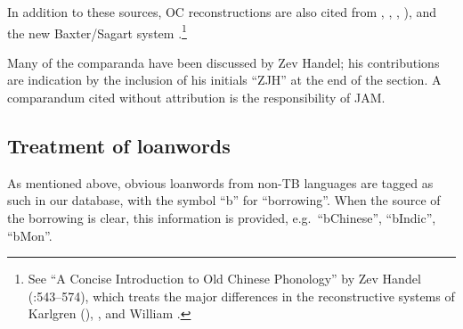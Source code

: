 In addition to these sources, OC reconstructions are also cited from \citet{GHC-OCP,GHC-RCC}, \citet{WSC-SH}, \citet{PW-HLY}, \citet{AS-ABCOC,AS-MOC}), and the new Baxter/Sagart system \citet{WHBLS-2011}.\footnote{See “A Concise Introduction to Old Chinese Phonology” by Zev Handel (\textit{}:543–574), which treats the major differences in the reconstructive systems of Karlgren (\textit{}), \citet{LI1976,LI1980}, and William \citet{WHB-OC}.}

Many of the comparanda have been discussed by Zev Handel; his contributions are indication by the inclusion of his initials “ZJH” at the end of the section. A comparandum cited without attribution is the responsibility of JAM.





\subsection{Treatment of loanwords}

As mentioned above, obvious loanwords from non-TB languages are tagged as such in our database, with the symbol “b” for “borrowing”. When the source of the borrowing is clear, this information is provided, e.g.\ “bChinese”, “bIndic”, “bMon”.

